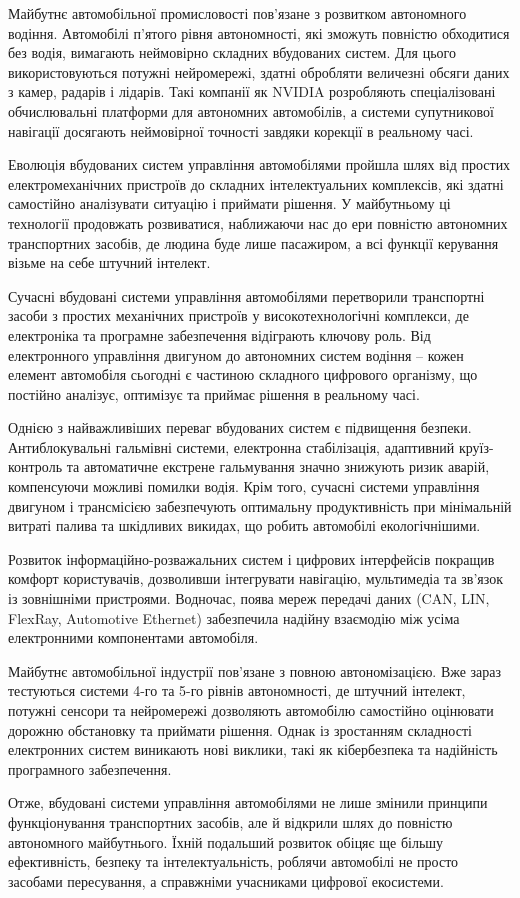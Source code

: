\documentclass[14pt]{extreport}
\begin{document}
Майбутнє автомобільної промисловості пов'язане з розвитком автономного водіння. Автомобілі п'ятого рівня автономності, які зможуть повністю обходитися без водія, вимагають неймовірно складних вбудованих систем. Для цього використовуються потужні нейромережі, здатні обробляти величезні обсяги даних з камер, радарів і лідарів. Такі компанії як NVIDIA розробляють спеціалізовані обчислювальні платформи для автономних автомобілів, а системи супутникової навігації досягають неймовірної точності завдяки корекції в реальному часі.

Еволюція вбудованих систем управління автомобілями пройшла шлях від простих електромеханічних пристроїв до складних інтелектуальних комплексів, які здатні самостійно аналізувати ситуацію і приймати рішення. У майбутньому ці технології продовжать розвиватися, наближаючи нас до ери повністю автономних транспортних засобів, де людина буде лише пасажиром, а всі функції керування візьме на себе штучний інтелект.

Сучасні вбудовані системи управління автомобілями перетворили транспортні засоби з простих механічних пристроїв у високотехнологічні комплекси, де електроніка та програмне забезпечення відіграють ключову роль. Від електронного управління двигуном до автономних систем водіння – кожен елемент автомобіля сьогодні є частиною складного цифрового організму, що постійно аналізує, оптимізує та приймає рішення в реальному часі.

Однією з найважливіших переваг вбудованих систем є підвищення безпеки. Антиблокувальні гальмівні системи, електронна стабілізація, адаптивний круїз-контроль та автоматичне екстрене гальмування значно знижують ризик аварій, компенсуючи можливі помилки водія. Крім того, сучасні системи управління двигуном і трансмісією забезпечують оптимальну продуктивність при мінімальній витраті палива та шкідливих викидах, що робить автомобілі екологічнішими.

Розвиток інформаційно-розважальних систем і цифрових інтерфейсів покращив комфорт користувачів, дозволивши інтегрувати навігацію, мультимедіа та зв’язок із зовнішніми пристроями. Водночас, поява мереж передачі даних (CAN, LIN, FlexRay, Automotive Ethernet) забезпечила надійну взаємодію між усіма електронними компонентами автомобіля.

Майбутнє автомобільної індустрії пов’язане з повною автономізацією. Вже зараз тестуються системи 4-го та 5-го рівнів автономності, де штучний інтелект, потужні сенсори та нейромережі дозволяють автомобілю самостійно оцінювати дорожню обстановку та приймати рішення. Однак із зростанням складності електронних систем виникають нові виклики, такі як кібербезпека та надійність програмного забезпечення.

Отже, вбудовані системи управління автомобілями не лише змінили принципи функціонування транспортних засобів, але й відкрили шлях до повністю автономного майбутнього. Їхній подальший розвиток обіцяє ще більшу ефективність, безпеку та інтелектуальність, роблячи автомобілі не просто засобами пересування, а справжніми учасниками цифрової екосистеми.
	
\end{document}
